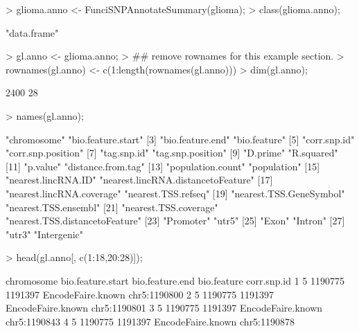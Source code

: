 \documentclass[12pt,fullpage]{article}
\begin{document}
\begin{Schunk}
\begin{Sinput}
> glioma.anno <- FunciSNPAnnotateSummary(glioma);
> class(glioma.anno);
\end{Sinput}
\begin{Soutput}
[1] "data.frame"
\end{Soutput}
\begin{Sinput}
> gl.anno <- glioma.anno;
> ## remove rownames for this example section.
> rownames(gl.anno) <- c(1:length(rownames(gl.anno)))
> dim(gl.anno);
\end{Sinput}
\begin{Soutput}
[1] 2400   28
\end{Soutput}
\begin{Sinput}
> names(gl.anno);
\end{Sinput}
\begin{Soutput}
 [1] "chromosome"                        "bio.feature.start"                
 [3] "bio.feature.end"                   "bio.feature"                      
 [5] "corr.snp.id"                       "corr.snp.position"                
 [7] "tag.snp.id"                        "tag.snp.position"                 
 [9] "D.prime"                           "R.squared"                        
[11] "p.value"                           "distance.from.tag"                
[13] "population.count"                  "population"                       
[15] "nearest.lincRNA.ID"                "nearest.lincRNA.distancetoFeature"
[17] "nearest.lincRNA.coverage"          "nearest.TSS.refseq"               
[19] "nearest.TSS.GeneSymbol"            "nearest.TSS.ensembl"              
[21] "nearest.TSS.coverage"              "nearest.TSS.distancetoFeature"    
[23] "Promoter"                          "utr5"                             
[25] "Exon"                              "Intron"                           
[27] "utr3"                              "Intergenic"                       
\end{Soutput}
\begin{Sinput}
> head(gl.anno[, c(1:18,20:28)]);
\end{Sinput}
\begin{Soutput}
  chromosome bio.feature.start bio.feature.end       bio.feature  corr.snp.id
1          5           1190775         1191397 EncodeFaire.known chr5:1190800
2          5           1190775         1191397 EncodeFaire.known chr5:1190801
3          5           1190775         1191397 EncodeFaire.known chr5:1190843
4          5           1190775         1191397 EncodeFaire.known chr5:1190878

\end{Soutput}
\end{Schunk}
\end{document}
